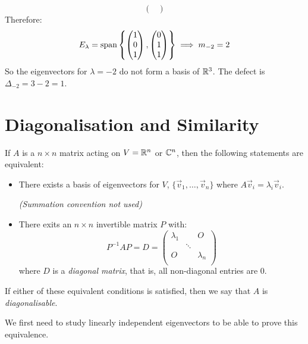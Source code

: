 \documentclass[../main.tex]{subfiles}
\begin{document}
\begin{example}
\begin{enumerate}
\[\begin{pmatrix}
      \end{pmatrix}
    \]
    Therefore:
    \[
      E_\lambda = \operatorname{span}\left\{\begin{pmatrix}
      1 \\
      0 \\
      1 \\
      \end{pmatrix},
      \begin{pmatrix}
      0 \\
      1 \\
      1 \\
      \end{pmatrix}\right\} \implies m_{-2} = 2
    \]
    So the eigenvectors for $\lambda = -2$ do not form a basis of $\mathbb{R}^{3}$.
    The defect is $\Delta_{-2} = 3 - 2 = 1$.
  \end{enumerate}
\end{example}
\section{Diagonalisation and Similarity}
\begin{proposition}
  If $A$ is a $n \times n$ matrix acting on $V = \mathbb{R}^{n}$ or $\mathbb{C}^{n}$, then the following statements are equivalent: \label{diagonalProp}
  \begin{itemize}
    \item There exists a basis of eigenvectors for $V$, $\{\vec{v}_1, \ldots, \vec{v}_n\}$ where $A \vec{v}_i = \lambda_i \vec{v}_i$.

      \textit{(Summation convention not used)}
    \item There exits an $n \times n$ invertible matrix $P$ with:
      \[
        P^{-1} A P = D = \begin{pmatrix}
        \lambda_1 &  & O \\
         & \ddots &  \\
        O &  & \lambda_n \\
        \end{pmatrix}
      \]
      where $D$ is a \textit{diagonal matrix}, that is, all non-diagonal entries are $0$.
  \end{itemize}
  If either of these equivalent conditions is satisfied, then we say that $A$ is \textit{diagonalisable}.
\end{proposition}
We first need to study linearly independent eigenvectors to be able to prove this equivalence.
\end{document}
